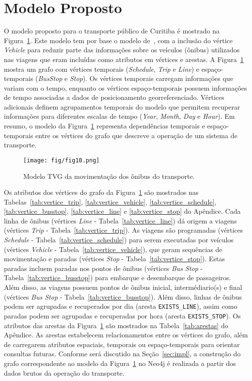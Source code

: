 \section{Modelo Proposto} \label{sec:met}

O modelo proposto para o transporte público de Curitiba é mostrado na Figura~\ref{fig:model}. Este modelo tem por base o modelo de~\cite{wach:19}, com a inclusão do vértice \emph{Vehicle} para reduzir parte das informações sobre os veículos (ônibus) utilizados nas viagens que eram incluídas como atributos em vértices e arestas. A Figura~\ref{fig:model} mostra um grafo com vértices temporais (\emph{Schedule}, \emph{Trip} e \emph{Line}) e espaço-temporais (\emph{BusStop} e \emph{Stop}). Os vértices temporais carregam informações que variam com o tempo, enquanto os vértices espaço-temporais possuem informações de tempo associadas a dados de posicionamento georreferenciado. Vértices adicionais definem agrupamentos temporais do modelo que permitem recuperar informações para diferentes escalas de tempo (\emph{Year}, \emph{Month}, \emph{Day} e \emph{Hour}). Em resumo, o modelo da Figura~\ref{fig:model} representa dependências temporais e espaço-temporais entre os vértices do grafo que descreve a operação de um sistema de transporte.

\begin{figure}
\centering
\texttt{[image: fig/fig10.png]}
\caption{Modelo TVG da movimentação dos ônibus do transporte.}
\label{fig:model}
\end{figure}



Os atributos dos vértices do grafo da Figura~\ref{fig:model} são mostrados nas Tabelas~\ref{tab:vertice_trip}, \ref{tab:vertice_vehicle}, \ref{tab:vertice_schedule}, \ref{tab:vertice_busstop}, \ref{tab:vertice_line} e \ref{tab:vertice_stop} do Apêndice. 
Cada linha de ônibus (vértices \emph{Line} - Tabela~\ref{tab:vertice_line}) dá origem a viagens (vértices \emph{Trip} - Tabela~\ref{tab:vertice_trip}). As viagens são programadas (vértices \emph{Schedule} - Tabela~\ref{tab:vertice_schedule}) para serem executadas por veículos (vértices \emph{Vehicle} - Tabela~\ref{tab:vertice_vehicle}), que geram sequências de movimentação e paradas (vértices \emph{Stop} - Tabela~\ref{tab:vertice_stop}). Estas paradas incluem paradas nos pontos de ônibus (vértices \emph{Bus Stop} - Tabela~\ref{tab:vertice_busstop}) para embarque e desembarque de passageiros. Além disso, as viagens possuem pontos de ônibus inicial, intermédiario(s) e final (vértices \emph{Bus Stop} - Tabela~\ref{tab:vertice_busstop}). Além disso, linhas de ônibus podem ser agrupadas e recuperados por dia (aresta \texttt{EXISTS\_LINE}), assim como paradas podem ser agrupadas e recuperadas por hora (aresta \texttt{EXISTS\_STOP}). Os atributos das arestas da Figura~\ref{fig:model} são mostrados na Tabela~\ref{tab:arestas} do Apêndice. As arestas estabelecem relacionamentos entre os vértices do grafo, além de carregarem atributos espaciais, temporais ou espaço-temporais para orientar consultas futuras.
Conforme será discutido na Seção~\ref{sec:impl}, a construção do grafo correspondente ao modelo da Figura~\ref{fig:model} no Neo4j é realizada a partir dos dados brutos da operação do transporte.

